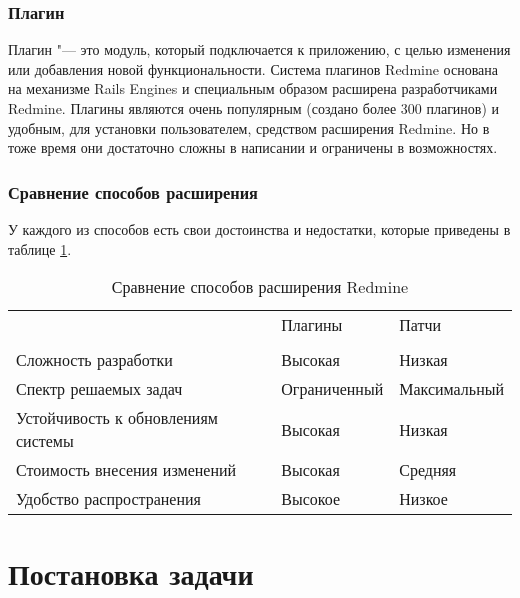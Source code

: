 \subsubsection{Плагин}
Плагин "--- это модуль, который подключается к приложению, с целью изменения
или добавления новой функциональности. Система плагинов Redmine основана на
механизме Rails Engines и специальным образом расширена разработчиками Redmine.
Плагины являются очень популярным (создано более 300 плагинов) и удобным,
для установки пользователем, средством расширения Redmine. Но в тоже время они
достаточно сложны в написании и ограничены в возможностях.

\subsubsection{Сравнение способов расширения}
У каждого из способов есть свои достоинства и недостатки, которые приведены в
таблице \ref{comparing_extensions}.
\begin{table}[hb!]
\small
\centering
\begin{tabular}{ 
>{\centering\arraybackslash}m{}
>{\centering\arraybackslash}m{}
>{\centering\arraybackslash}m{}}
& Плагины & Патчи\\
&&\\
\hline
Сложность разработки & Высокая & Низкая \\
\hline
Спектр решаемых задач & Ограниченный & Максимальный\\
\hline
Устойчивость к обновлениям системы & Высокая & Низкая \\
\hline
Стоимость внесения изменений & Высокая & Средняя \\
\hline
Удобство распространения & Высокое & Низкое \\
\hline
\end{tabular}
\caption{Сравнение способов расширения Redmine}
\label{comparing_extensions}
\end{table}


\section{Постановка задачи}



